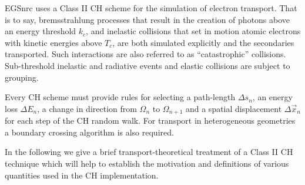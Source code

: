 EGSnrc uses a Class II CH scheme
for the simulation of electron transport.
That is to say, bremsstrahlung processes that result in the
creation of photons above an energy threshold $k_c$, and
inelastic collisions that set in motion atomic electrons with
kinetic energies above $T_c$, are both simulated explicitly and the
secondaries transported. Such interactions are also referred to as
``catastrophic'' collisions.
Sub-threshold inelastic and radiative events and
elastic collisions are subject to grouping.

Every CH scheme must provide rules for selecting
a path-length $\Delta s_n$, an energy loss $\Delta E_n$,
a change in direction from
$\Omega_n$ to $\Omega_{n+1}$ and a spatial displacement
$\Delta \vec{x}_n$ for each step of the CH random walk. For transport in
heterogeneous geometries a boundary crossing algorithm is
also required.

In the following we give a brief transport-theoretical
treatment of a Class II CH technique which will help
to establish the motivation and definitions of
various quantities used in the CH implementation.

